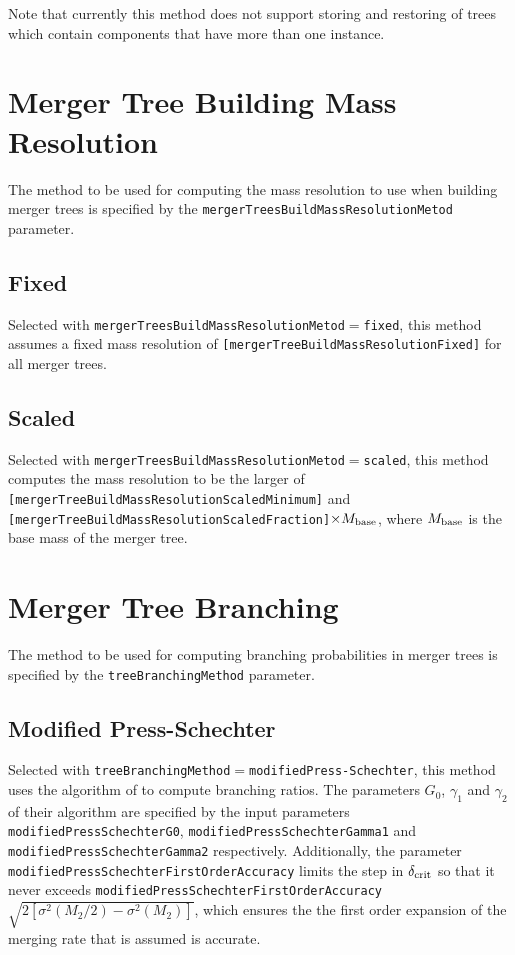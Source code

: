 Note that currently this method does not support storing and restoring of trees which contain components that have more than one instance.

\section{Merger Tree Building Mass Resolution}\label{sec:MergerTreeBuildingMassResolution}

The method to be used for computing the mass resolution to use when building merger trees is specified by the {\tt mergerTreesBuildMassResolutionMetod} parameter.

\subsection{Fixed}

Selected with {\tt mergerTreesBuildMassResolutionMetod}$=${\tt fixed}, this method assumes a fixed mass resolution of {\tt [mergerTreeBuildMassResolutionFixed]} for all merger trees.

\subsection{Scaled}

Selected with {\tt mergerTreesBuildMassResolutionMetod}$=${\tt scaled}, this method computes the mass resolution to be the larger of {\tt [mergerTreeBuildMassResolutionScaledMinimum]} and {\tt [mergerTreeBuildMassResolutionScaledFraction]}$\times M_{\rm base}$, where $M_{\rm base}$ is the base mass of the merger tree.

\section{Merger Tree Branching}

The method to be used for computing branching probabilities in merger trees is specified by the {\tt treeBranchingMethod} parameter.

\subsection{Modified Press-Schechter}

Selected with {\tt treeBranchingMethod}$=${\tt modifiedPress-Schechter}, this method uses the algorithm of \cite{parkinson_generating_2008} to compute branching ratios. The parameters $G_0$, $\gamma_1$ and $\gamma_2$ of their algorithm are specified by the input parameters {\tt modifiedPressSchechterG0}, {\tt modifiedPressSchechterGamma1} and {\tt modifiedPressSchechterGamma2} respectively. Additionally, the parameter {\tt modifiedPressSchechterFirstOrderAccuracy} limits the step in $\delta_{\rm crit}$ so that it never exceeds {\tt modifiedPressSchechterFirstOrderAccuracy}$\sqrt{2[\sigma^2(M_2/2)-\sigma^2(M_2)]}$, which ensures the the first order expansion of the merging rate that is assumed is accurate.

